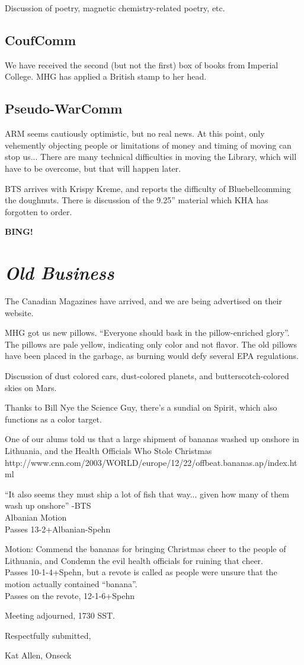 \documentclass[10pt]{article}
\newcommand{\bing}{{\bf BING!} }
\newcommand{\goto}[1]{\bing \vskip 12pt \section*{{\em{#1}}}}
\begin{document}
Discussion of poetry, magnetic chemistry-related poetry, etc.

\subsection{CoufComm}
We have received the second (but not the first) box of books from
Imperial College. MHG has applied a British stamp to her head.

\subsection{Pseudo-WarComm}
ARM seems cautiously optimistic, but no real news.  At this point,
only vehemently objecting people or limitations of money and timing of
moving can stop us... There are many technical difficulties in moving
the Library, which will have to be overcome, but that will happen
later.

BTS arrives with Krispy Kreme, and reports the difficulty of
Bluebellcomming the doughnuts. There is discussion of the 9.25''
material which KHA has forgotten to order.

\goto{Old Business}
The Canadian Magazines have arrived, and we are being advertised on
their website.

MHG got us new pillows. ``Everyone should bask in the pillow-enriched
glory''.  The pillows are pale yellow, indicating only color and not
flavor. The old pillows have been placed in the garbage, as burning
would defy several EPA regulations.

Discussion of dust colored cars, dust-colored planets, and
butterscotch-colored skies on Mars.

Thanks to Bill Nye the Science Guy, there's a sundial on Spirit, which
also functions as a color target.

One of our alums told us that a large shipment of bananas washed up
onshore in Lithuania, and the Health Officials Who Stole Christmas\\
http://www.cnn.com/2003/WORLD/europe/12/22/offbeat.bananas.ap/index.html

``It also seems they must ship a lot of fish that way... given how
many of them wash up onshore'' -BTS\\
Albanian Motion\\
Passes 13-2+Albanian-Spehn

Motion: Commend the bananas for bringing Christmas cheer to the people
of Lithuania, and Condemn the evil health officials for ruining that cheer.\\
Passes 10-1-4+Spehn, but a revote is called as people were unsure that
the motion actually contained ``banana''.\\
Passes on the revote, 12-1-6+Spehn

Meeting adjourned, 1730 SST.

\vspace{18pt}

\centerline{Respectfully submitted,}
\centerline{Kat Allen,  Onseck}
\end{document}
